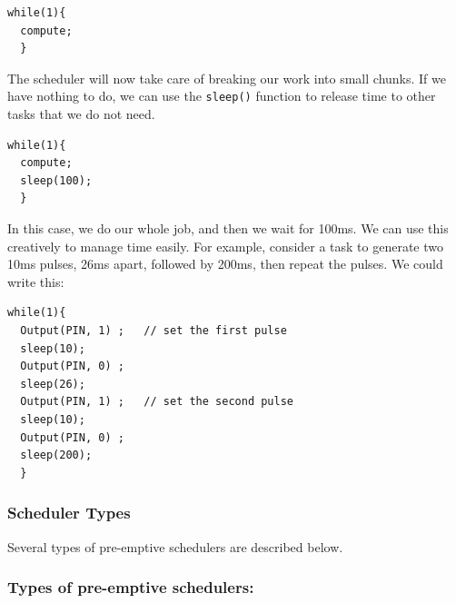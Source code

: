 \documentclass{article}	%
\begin{document}
\begin{verbatim}
while(1){
  compute;
  }
\end{verbatim}
The scheduler will now take care of breaking our work into small chunks.  If we have nothing to do, we can use the {\tt sleep()} function to release time to other tasks that we do not need.	%

\begin{verbatim}
while(1){
  compute;
  sleep(100);
  }
\end{verbatim}
In this case, we do our whole job, and then we wait for 100ms.   We can use this creatively to manage time easily. For example, consider a task to generate two 10ms pulses, 26ms apart, followed by 200ms, then repeat the pulses.   We could write this:

\begin{verbatim}
while(1){
  Output(PIN, 1) ;   // set the first pulse
  sleep(10);
  Output(PIN, 0) ; 
  sleep(26);
  Output(PIN, 1) ;   // set the second pulse
  sleep(10);
  Output(PIN, 0) ; 
  sleep(200);
  }
\end{verbatim}


\subsubsection*{Scheduler Types}
Several types of pre-emptive schedulers are described below.


\subsubsection*{Types of pre-emptive schedulers:}
\end{document}
